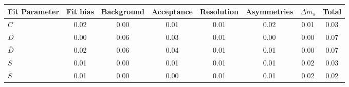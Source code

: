 \begin{tabular}{l  c  c  c  c  c  c  | c }
\hline
\hline
Fit Parameter & Fit bias & Background & Acceptance & Resolution & Asymmetries & $\Delta m_{s}$ &  Total  \\ 
\hline
$C$ & 0.02 & 0.00 & 0.01 & 0.01 & 0.02 & 0.01 & 0.03 \\ 
$D$ & 0.00 & 0.06 & 0.03 & 0.01 & 0.00 & 0.00 & 0.07 \\ 
$\bar{D}$ & 0.02 & 0.06 & 0.04 & 0.01 & 0.01 & 0.00 & 0.07 \\ 
$S$ & 0.01 & 0.00 & 0.01 & 0.01 & 0.01 & 0.02 & 0.03 \\ 
$\bar{S}$ & 0.01 & 0.00 & 0.00 & 0.01 & 0.01 & 0.02 & 0.02 \\ 
\hline
\hline
\end{tabular}
